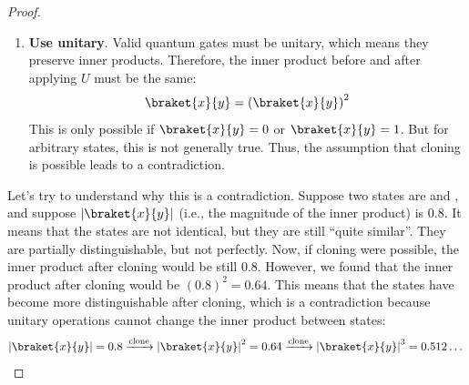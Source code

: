 \begin{proof}
\begin{enumerate}
        \item \textbf{Use unitary}. Valid quantum gates must be unitary, which means they preserve inner products. Therefore, the inner product before and after applying $U$ must be the same:
        \begin{equation*}
            \braket{x}{y} = \left(\braket{x}{y}\right)^2
        \end{equation*}
        This is only possible if $\braket{x}{y} = 0$ or $\braket{x}{y} = 1$. But for arbitrary states, this is not generally true. Thus, the assumption that cloning is possible leads to a contradiction.
    \end{enumerate}
    Let's try to understand why this is a contradiction. Suppose two states are  and , and suppose $\left|\braket{x}{y}\right|$ (i.e., the magnitude of the inner product) is $0.8$. It means that the states are not identical, but they are still ``quite similar''. They are partially distinguishable, but not perfectly. Now, if cloning were possible, the inner product after cloning would be still $0.8$. However, we found that the inner product after cloning would be $\left(0.8\right)^2 = 0.64$. This means that the states have become more distinguishable after cloning, which is a contradiction because unitary operations cannot change the inner product between states:
    \begin{equation*}
        \left|\braket{x}{y}\right| = 0.8 \xrightarrow{\text{clone}} \left|\braket{x}{y}\right|^{2} = 0.64 \xrightarrow{\text{clone}} \left|\braket{x}{y}\right|^{3} = 0.512 \dots
    \end{equation*}
\end{proof}

